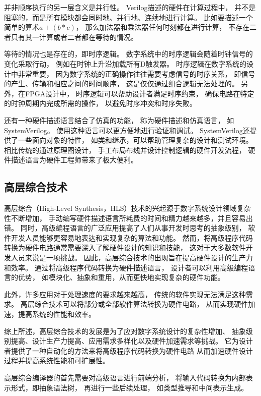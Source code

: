 并非顺序执行的另一层含义是并行性。
Verilog描述的硬件在计算过程中，
并不是阻塞的，而是所有模块都会同时地、并行地、连续地进行计算。
比如要描述一个简单的算术$a + (b * c)$，
那么加法器和乘法器任何时刻都在进行计算，
不存在二者只有其一计算或者二者都在等待的情况。

等待的情况也是存在的，即时序逻辑。
数字系统中的时序逻辑会随着时钟信号的变化采取行动，
例如在时钟上升沿加载所有D触发器。
时序逻辑在数字系统的设计中非常重要，
因为数字系统的正确操作往往需要考虑信号的时序关系，
即信号的产生、传输和相应之间的时间顺序，
这是仅仅通过组合逻辑无法处理的。
另外，在FPGA设计中，
时序逻辑可以帮助设计者满足时序约束，
确保电路在特定的时钟周期内完成所需的操作，
以避免时序冲突和时序失败。

还有一种硬件描述语言结合了仿真的功能，
称为硬件描述和仿真语言，
如SystemVerilog。
使用这种语言可以更方便地进行验证和调试。
SystemVerilog还提供了一些面向对象的特性，
如类和继承，可以帮助管理复杂的设计和测试环境。
相比传统的通过原理图设计，
手工布局布线并设计控制逻辑的硬件开发流程，
硬件描述语言为硬件工程师带来了极大便利。

\subsection{高层综合技术}

高层综合（High-Level Synthesis，HLS）技术的兴起源于数字系统设计领域复杂性不断增加，
手动编写硬件描述语言所耗费的时间和精力越来越多，并且容易出错。
同时，高级编程语言的广泛应用提高了人们从事开发时思考的抽象级别，
软件开发人员能够更容易地表达和实现复杂的算法和功能。
然而，将高级程序代码转换为硬件电路通常需要深入了解硬件设计的知识和技能，
这对于大多数软件开发人员来说是一项挑战。
因此，高层综合技术的出现旨在提高硬件设计的生产力和效率。
通过将高级程序代码转换为硬件描述语言，
设计者可以利用高级编程语言的优势，
如模块化、抽象和重用，从而更快地实现复杂的硬件功能。

此外，许多应用对于处理速度的要求越来越高，
传统的软件实现无法满足这种需求。
高层综合技术可以将部分或全部软件算法转换为硬件电路，
从而实现硬件加速，提高系统的性能和效率。

综上所述，高层综合技术的发展是为了应对数字系统设计的复杂性增加、
抽象级别提高、设计生产力提高、应用需求多样化以及硬件加速需求等挑战。
它为设计者提供了一种自动化的方法来将高级程序代码转换为硬件电路
从而加速硬件设计过程并提高系统性能和可扩展性。

高层综合编译器的首先需要对高级语言进行前端分析，
将输入代码转换为内部表示形式，即抽象语法树，
再进行一些后续处理，
如类型推导和中间表示生成。

